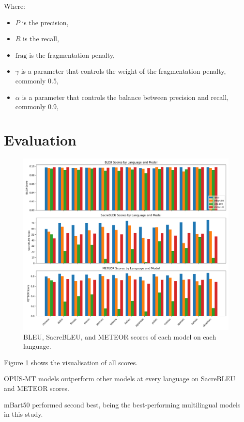 \documentclass[a4paper]{article}
\begin{document}
Where:
\begin{itemize}
    \item \(P\) is the precision,
    \item \(R\) is the recall,
    \item \(\text{frag}\) is the fragmentation penalty,
    \item \(\gamma\) is a parameter that controls the weight of the fragmentation penalty, commonly 0.5,
    \item \(\alpha\) is a parameter that controls the balance between precision and recall, commonly 0.9,
\end{itemize}


\section{Evaluation}

\begin{figure}[htbp]
    \centering
    \includegraphics[width=1\linewidth]{figures/metrics_bar.png}
    \caption{BLEU, SacreBLEU, and METEOR scores of each model on each language.}
    \label{fig:result_visual}
\end{figure}


Figure \ref{fig:result_visual} shows the visualisation of all scores.

OPUS-MT models outperform other models at every language on SacreBLEU and METEOR scores.

mBart50 performed second best, being the best-performing multilingual models in this study.
\end{document}
